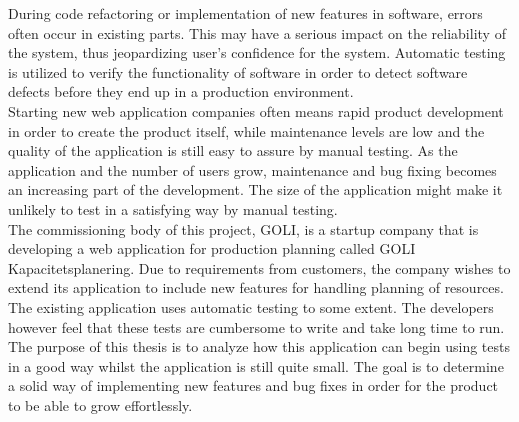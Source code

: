 During code refactoring or implementation of new features in software,
errors often occur in existing parts. This may have a serious impact on
the reliability of the system, thus jeopardizing user's confidence for
the system. Automatic testing is utilized to verify the functionality of
software in order to detect software defects before they end up in a
production environment.\\

Starting new web application companies often means rapid product
development in order to create the product itself, while maintenance
levels are low and the quality of the application is still easy to
assure by manual testing. As the application and the number of users
grow, maintenance and bug fixing becomes an increasing part of the
development. The size of the application might make it unlikely to
test in a satisfying way by manual testing.\\

The commissioning body of this project, GOLI, is a startup company that
is developing a web application for production planning called GOLI
Kapacitetsplanering. Due to requirements from customers, the company
wishes to extend its application to include new features for handling
planning of resources.\\

The existing application uses automatic testing to some extent. The
developers however feel that these tests are cumbersome to write and
take long time to run. The purpose of this thesis is to analyze how
this application can begin using tests in a good way whilst the
application is still quite small. The goal is to determine a solid way
of implementing new features and bug fixes in order for the product to
be able to grow effortlessly.\\
